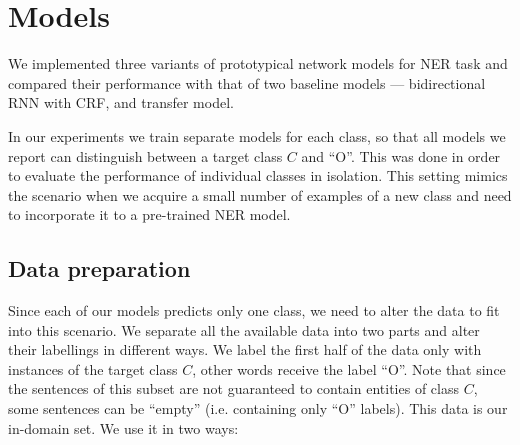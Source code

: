\section{Models}

We implemented three variants of prototypical network models for NER task and compared their performance with that of two baseline models --- bidirectional RNN with CRF, and transfer model. 

In our experiments we train separate models for each class, so that all models we report can distinguish between a target class $C$ and ``O''. This was done in order to evaluate the performance of individual classes in isolation. This setting mimics the scenario when we acquire a small number of examples of a new class and need to incorporate it to a pre-trained NER model. %





\subsection{Data preparation}
\label{section:data_preparation}

Since each of our models predicts only one class, we need to alter the data to fit into this scenario. We separate all the available data into two parts and alter their labellings in different ways. We label the first half of the data only with instances of the target class $C$, other words receive the label ``O''. Note that since the sentences of this subset are not guaranteed to contain entities of class $C$, some sentences can be ``empty'' (i.e. containing only ``O'' labels). This data is our in-domain set. We use it in two ways:

